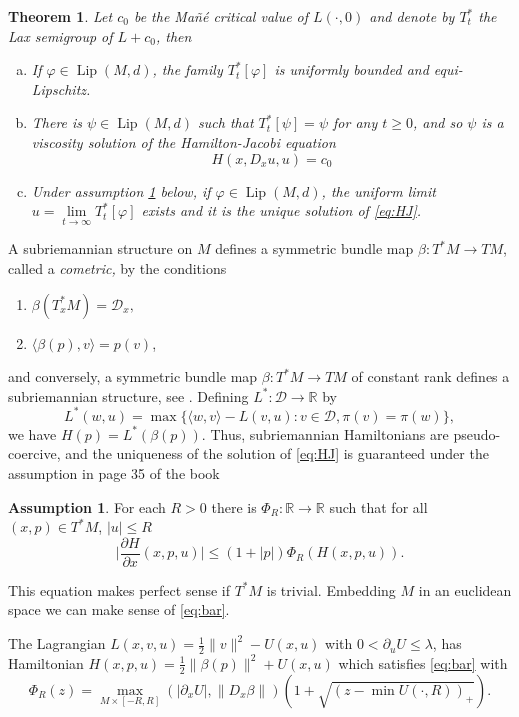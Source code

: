 \documentclass[12pt]{amsart}
\theoremstyle{plain}
\newtheorem{theorem}{Theorem}
\theoremstyle{definition}
\newtheorem{assumption}{Assumption}
\newcommand{\R}{\mathbb R}
\newcommand{\cD}{\mathcal D}
\newcommand{\fui}{\varphi}
\newcommand{\be}{\beta}
\newcommand{\la}{\lambda}
\newcommand{\rip}{\rangle}
\newcommand{\lip}{\langle}
\newcommand{\Lip}{\operatorname{Lip}}
\begin{document}
\begin{theorem}\label{main-stationary}
  Let $c_0$ be the Ma\~n\'e critical value of $L(\cdot,0)$ and denote by $T_t^*$ the Lax semigroup  of $L+c_0$, then 
  \begin{enumerate}[(a)]
  \item 
If $\fui\in\Lip(M,d)$, the family $T^*_t[\fui]$ is uniformly bounded and equi-Lipschitz.
\item There is $\psi\in\Lip(M,d)$ such that $T^*_t[\psi]=\psi$ for
  any $t\ge 0$, and so  $\psi$ is a viscosity solution of the Hamilton-Jacobi equation 
\begin{equation}\label{eq:HJ}
  H(x,D_xu,u)=c_0
\end{equation}
\item Under assumption \ref{Bar} below, if $\fui\in\Lip(M,d)$, the uniform limit
  $u=\lim\limits_{t\to\infty}T^*_t[\fui]$ exists and it is the unique
  solution of \eqref{eq:HJ}.
  \end{enumerate}
\end{theorem}
A subriemannian structure on $M$ defines a symmetric bundle map
 $\be:T^*M\to TM$,   called a {\em cometric,} by the conditions
  \begin{enumerate}
  \item $\be(T_x^*M)=\cD_x,$
  \item $\lip\be(p),v\rip=p(v)$,
  \end{enumerate}
and conversely, a symmetric  bundle map $\be:T^*M\to TM$ of constant rank
defines a subriemannian structure, see \cite{M}.
Defining $L^*:\cD\to\R$ by
\[L^*(w,u)=\max\{\lip w,v\rip-L(v,u):v\in\cD , \pi(v)=\pi(w)\},\]
we have $H(p)=L^*(\be(p))$.
Thus, subriemannian Hamiltonians are pseudo-coercive, and the uniqueness
of the solution of \eqref{eq:HJ} is guaranteed under the assumption in page 35
of the book \cite{Ba}
\begin{assumption}\label{Bar}
  For each $R>0$ there is $\Phi_R:\R\to\R$ such that
for all $(x,p)\in T^*M$, $|u|\le R$
\begin{equation}
  \label{eq:bar}
 \Big|\frac{\partial H}{\partial x}(x,p,u)\Big|\le (1+|p|) \Phi_R(H(x,p,u)).
\end{equation}
\end{assumption}
This equation makes perfect sense if $T^*M$ is trivial. Embedding $M$ in an
euclidean space we can make sense of \ref{eq:bar}.

The Lagrangian $L(x,v,u)=\frac 12 \|v\|^2-U(x,u)$ with $0<\partial_uU\le\la$,
has  Hamiltonian $H(x,p,u)=\frac 12 \|\be(p)\|^2+U(x,u)$ which
satisfies \eqref{eq:bar} with 
\[\Phi_R(z)=\max_{M\times[-R,R]}(|\partial_xU|,\|D_x\be\|)(1+\sqrt{(z-\min U(\cdot,R))_+}).\]
\end{document}
